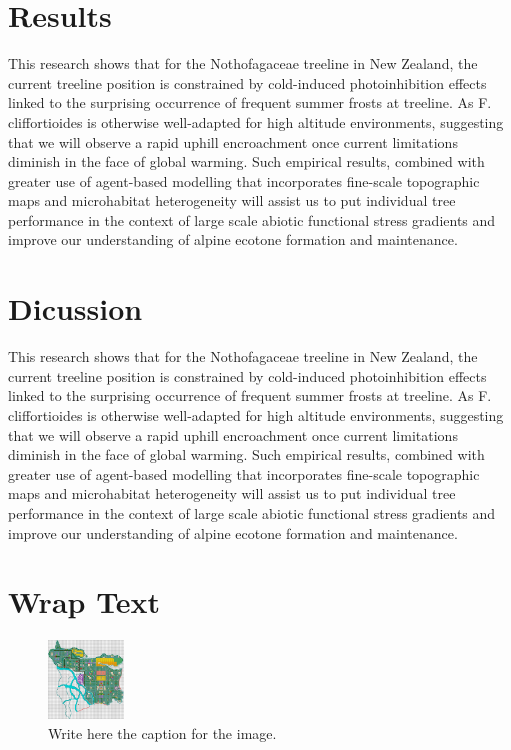\documentclass[12pt]{article}
\begin{document}
\section{Results}


\noindent This research shows that for the Nothofagaceae treeline in New Zealand, the current treeline position is constrained by cold-induced photoinhibition effects linked to the surprising occurrence of frequent summer frosts at treeline. As F. cliffortioides is otherwise well-adapted for high altitude environments, suggesting that we will observe a rapid uphill encroachment once current limitations diminish in the face of global warming. Such empirical results, combined with greater use of agent-based modelling that incorporates fine-scale topographic maps and microhabitat heterogeneity will assist us to put individual tree performance in the context of large scale abiotic functional stress gradients and improve our understanding of alpine ecotone formation and maintenance.



\section{Dicussion}


\noindent This research shows that for the Nothofagaceae treeline in New Zealand, the current treeline position is constrained by cold-induced photoinhibition effects linked to the surprising occurrence of frequent summer frosts at treeline. As F. cliffortioides is otherwise well-adapted for high altitude environments, suggesting that we will observe a rapid uphill encroachment once current limitations diminish in the face of global warming. Such empirical results, combined with greater use of agent-based modelling that incorporates fine-scale topographic maps and microhabitat heterogeneity will assist us to put individual tree performance in the context of large scale abiotic functional stress gradients and improve our understanding of alpine ecotone formation and maintenance.


\section{Wrap Text}


\begin{figure}
  \includegraphics[scale=0.05, width=20mm]{analysis/figures/Leiden_8.jpg}
  \caption{Write here the caption for the image.}
  \label{fig:imagex}
\end{figure}
\end{document}
